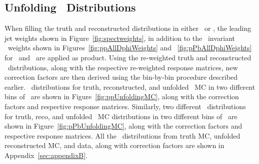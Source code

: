



\FloatBarrier
\subsection{ Unfolding \Dphi\ Distributions }
When filling the truth and reconstructed distributions in either \pp\ or \pPb, the leading jet weights shown in Figure~\ref{fig:spectweights}, in addition to the \pT\ invariant \Dphi\ weights shown in Figures~\ref{fig:ppAllDphiWeights} and ~\ref{fig:pPbAllDphiWeights} for \pp\ and \pPb\ are applied as product. Using the re-weighted truth and reconstructed \Dphi\ distributions, along with the respective re-weighted response matrices, new correction factors are then derived using the bin-by-bin procedure described earlier. \Dphi\ distributions for truth, reconstructed, and unfolded \pp\ MC in two different bins of \ptone\ are shown in Figure~\ref{fig:ppUnfoldingMC}, along with the correction factors and respective response matrices. Similarly, two different \Dphi\ distributions for truth, reco, and unfolded \pPb\ MC distributions in two different bins of \ptone\ are shown in Figure~\ref{fig:pPbUnfoldingMC}, along with the correction factors and respective response matrices. 
All the \Dphi\ distributions from truth MC, unfolded reconstructed MC, and data, along with correction factors are shown in Appendix~\ref{sec:appendixB}.


